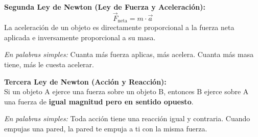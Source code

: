 \documentclass[12pt, letterpaper]{article}
\begin{document}
\begin{cuadroteoria}
  \textbf{Segunda Ley de Newton (Ley de Fuerza y Aceleración):}
  $$\vec{F}_{\text{neta}} = m \cdot \vec{a}$$
  La aceleración de un objeto es directamente proporcional a la fuerza neta aplicada e inversamente proporcional a su masa.

  \textit{En palabras simples:} Cuanta más fuerza aplicas, más acelera. Cuanta más masa tiene, más le cuesta acelerar.
\end{cuadroteoria}

\newpage

\begin{cuadroteoria}
  \textbf{Tercera Ley de Newton (Acción y Reacción):}\\
  Si un objeto A ejerce una fuerza sobre un objeto B, entonces B ejerce sobre A una fuerza de \textbf{igual magnitud pero en sentido opuesto}.

  \textit{En palabras simples:} Toda acción tiene una reacción igual y contraria. Cuando empujas una pared, la pared te empuja a ti con la misma fuerza.
\end{cuadroteoria}
\end{document}
